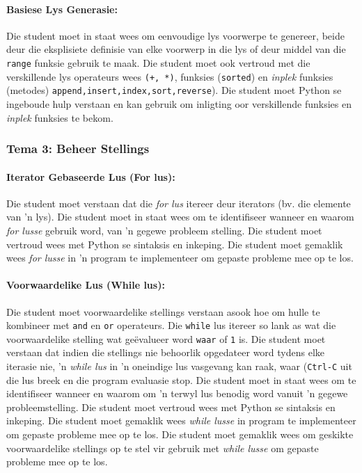 	  \paragraph{Basiese Lys Generasie:}
                  Die student moet in staat wees om eenvoudige lys voorwerpe te genereer, 
             beide deur die eksplisiete definisie van elke voorwerp in die lys of deur middel van 
	   die \texttt{range} funksie gebruik te maak. Die student 
             moet ook vertroud met die verskillende lys operateurs wees 
             \texttt {(+, *)}, funksies (\texttt{sorted}) en \textit{inplek}
             funksies (metodes) 
             \texttt {append,insert,index,sort,reverse}). Die student 
             moet Python se ingeboude hulp verstaan en kan gebruik
		 om inligting oor verskillende funksies en 
             \textit{inplek} funksies te bekom.

                
        \subsubsection{Tema 3: Beheer Stellings}
            \paragraph{Iterator Gebaseerde Lus (For lus):}
		Die student moet verstaan ​​dat die \textit{for lus} 
             itereer deur iterators (bv. die elemente van 'n 
             lys). Die student moet in staat wees om te identifiseer wanneer en waarom
             \textit{for lusse} gebruik  word, van 'n gegewe probleem 
             stelling. Die student moet vertroud wees met Python se  
             sintaksis en inkeping. Die student moet gemaklik wees 
             \textit {for lusse} in 'n program te implementeer om gepaste probleme mee op te los.

	     \paragraph{Voorwaardelike Lus (While lus):}
		Die student moet voorwaardelike stellings verstaan asook hoe
             om hulle te kombineer met \texttt {and} en \texttt{or} 
             operateurs. Die \texttt{while} lus itereer so lank as wat die voorwaardelike stelling
    	    wat ge\"evalueer word \texttt{waar} of \texttt{1} is. Die 
             student moet verstaan ​​dat indien die stellings nie 
             behoorlik opgedateer word tydens elke iterasie nie, 'n \textit {while lus} in 'n oneindige lus
             vasgevang kan raak, waar (\texttt {Ctrl-C} uit die lus breek en die program evaluasie stop. Die 	  	
	    student moet in staat wees om te 
             identifiseer wanneer en waarom om 'n terwyl lus benodig word vanuit 'n gegewe 
             probleemstelling. Die student moet vertroud wees met Python se  
             sintaksis en inkeping. Die student moet gemaklik wees 
             \textit {while lusse} in program te implementeer om gepaste probleme mee op te los.
 	    Die student moet gemaklik wees om geskikte voorwaardelike stellings op te stel vir gebruik met
	    \textit{while lusse} om gepaste probleme mee op te los.
		
